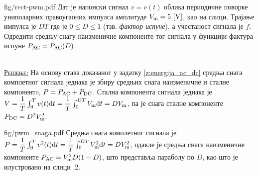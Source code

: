 \begin{slikaDesno}{fig/rect-pwm.pdf}
    \PID \label{z:snaga_pwm}
    Дат jе напонски сигнал $v = v(t)$ облика периодичне поворке униполарних правоугаоних 
    импулса амплитуде ${V_{\rm m} = 5\,\left[\mathrm{V}\right]}$, као на слици. Трајање импулса је $DT$ где је 
    $0 \leq D \leq 1$ (тзв. \textit{фактор испуне}), а учестаност сигнала је $f$. Одредити средњу снагу 
    наизменичне компоненте тог сигнала у функцији фактура испуне $P_{\rm AC} = P_{\rm AC}(D)$. 
\end{slikaDesno}
\\[2mm]

\textsc{\underline{Решење:}}
На основу става доказаног у задатку \ref{z:energija_ac_dc} средња снага комплетног сигнала
једнака је збиру средњих снага наизменичне и сталне компонентe, $P = P_{\rm AC} + P_{\rm DC}$. 
Стална компонента сигнала једнака је 
$V = \dfrac{1}{T} \int_0^T v(t) {\rm d} t = \dfrac{1}{T} \int_0^{DT} V_{\rm m} {\rm d} t = DV_{\rm m}$, па је 
снага сталне компоненте $P_{\rm DC} = D^2 V_{\rm m}^2$. 

\begin{slikaDesno}{fig/pwm_snaga.pdf}
    Средња снага комплетног сигнала је 
    $P = \dfrac{1}{T} \int_0^T v^2(t) {\rm d} t = \dfrac{1}{T} \int_0^{DT} V_{\rm m}^2 {\rm d} t = DV_{\rm m}^2$,
    одакле је средња снага наизменичне компоненте   
    $P_{\rm AC} = V_{\rm m}^2 D(1 - D)$, што представља параболу по $D$, као што је илустровано на слици \ID.2.
\end{slikaDesno}

